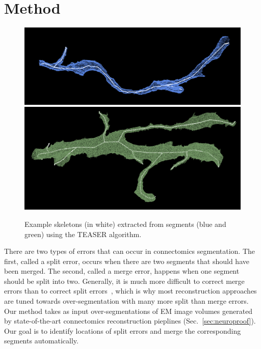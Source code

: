 \section{Method}

\begin{figure}[t]
	\centering
	\includegraphics[width=0.92\linewidth]{./figures/skeleton1.png}
	\includegraphics[width=0.92\linewidth]{./figures/skeleton2.png}
	\caption{Example skeletons (in white) extracted from segments (blue and green) using the TEASER algorithm.}
	\label{fig:skeletonization}
\end{figure}

There are two types of errors that can occur in connectomics segmentation.
The first, called a split error, occurs when there are two segments that should have been merged. The second, called a merge error, happens when one segment should be split into two. Generally, it is much more difficult to correct merge errors than to correct split errors~\cite{parag2015properties}, which is why most reconstruction approaches are tuned towards over-segmentation with many more split than merge errors. Our method takes as input over-segmentations of EM image volumes generated by state-of-the-art connectomics reconstruction pieplines (Sec.~\ref{sec:neuroproof}). Our goal is to identify locations of split errors and merge the corresponding segments automatically.

